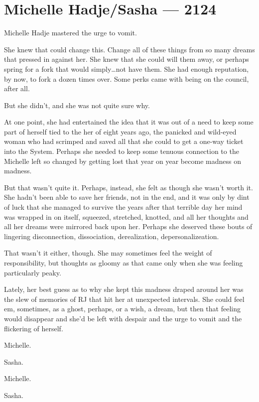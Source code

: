 \hypertarget{michelle-hadjesasha-2124}{%
\chapter{Michelle Hadje/Sasha — 2124}\label{michelle-hadjesasha-2124}}

Michelle Hadje mastered the urge to vomit.

She knew that could change this. Change all of these things from so many dreams that pressed in against her. She knew that she could will them away, or perhaps spring for a fork that would simply\ldots not have them. She had enough reputation, by now, to fork a dozen times over. Some perks came with being on the council, after all.

But she didn't, and she was not quite sure why.

At one point, she had entertained the idea that it was out of a need to keep some part of herself tied to the her of eight years ago, the panicked and wild-eyed woman who had scrimped and saved all that she could to get a one-way ticket into the System. Perhaps she needed to keep some tenuous connection to the Michelle left so changed by getting lost that year on year become madness on madness.

But that wasn't quite it. Perhaps, instead, she felt as though she wasn't worth it. She hadn't been able to save her friends, not in the end, and it was only by dint of luck that she managed to survive the years after that terrible day her mind was wrapped in on itself, squeezed, stretched, knotted, and all her thoughts and all her dreams were mirrored back upon her. Perhaps she deserved these bouts of lingering disconnection, dissociation, derealization, depersonalizeation.

That wasn't it either, though. She may sometimes feel the weight of responsibility, but thoughts as gloomy as that came only when she was feeling particularly peaky.

Lately, her best guess as to why she kept this madness draped around her was the slew of memories of RJ that hit her at unexpected intervals. She could feel em, sometimes, as a ghost, perhaps, or a wish, a dream, but then that feeling would disappear and she'd be left with despair and the urge to vomit and the flickering of herself.

Michelle.

Sasha.

Michelle.

Sasha.

